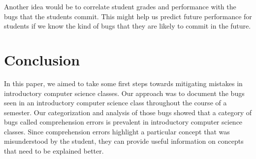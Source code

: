 \documentclass{sig-alternate}
\begin{document}
Another idea would be to correlate student grades and performance with the bugs that the students commit. This might help us predict future performance for students if we know the kind of bugs that they are likely to commit in the future.\\

\section{Conclusion}

In this paper, we aimed to take some first steps towards mitigating mistakes in introductory computer science classes. Our approach was to document the bugs seen in an introductory computer science class throughout the course of a semester. Our categorization and analysis of those bugs showed that a category of bugs called comprehension errors is prevalent in introductory computer science classes. Since comprehension errors highlight a particular concept that was misunderstood by the student, they can provide useful information on concepts that need to be explained better.\\


%


\balancecolumns
\end{document}
